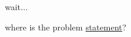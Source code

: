 \noindent
wait... 


where is the problem \href{https://www.youtube.com/watch?v=dQw4w9WgXcQ}{statement}?


